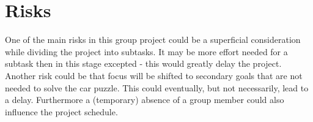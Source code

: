\documentclass[a4paper, 12pt]{scrartcl}%
\begin{document}
\section{Risks}
One of the main risks in this group project could be a superficial consideration while dividing the project into subtasks. It may be more effort needed for a subtask then in this stage excepted - this would greatly delay the project. Another risk could be that focus will be shifted to secondary goals that are not needed to solve the car puzzle. This could eventually, but not necessarily, lead to a delay. Furthermore a (temporary) absence of a group member could also influence the project schedule.
\end{document}
